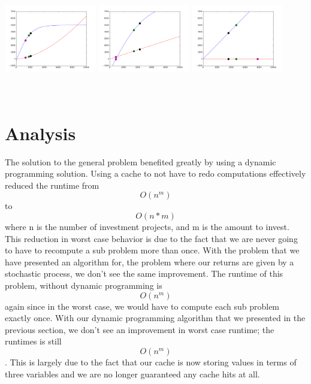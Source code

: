 \documentclass{article}
\begin{document}
\includegraphics[width=4cm, height=5cm]{data_1}
\includegraphics[width=4cm, height=5cm]{data_2}
\includegraphics[width=4cm, height=5cm]{data_3}


\newline
\pagebreak
\section{Analysis}
The solution to the general problem benefited greatly by using a dynamic programming solution.  Using a cache to not have to redo computations effectively reduced the runtime from $$O(n^{m})$$ to $$O(n*m)$$ where n is the number of investment projects, and m is the amount to invest.  This reduction in worst case behavior is due to the fact that we are never going to have to recompute a sub problem more than once.  
\newline
With the problem that we have presented an algorithm for, the problem where our returns are given by a stochastic process, we don't see the same improvement.  The runtime of this problem, without dynamic programming is $$O(n^{m})$$ again since in the worst case, we would have to compute each sub problem exactly once. With our dynamic programming algorithm that we presented in the previous section, we don't see an improvement in worst case runtime; the runtimes is still $$O(n^{m})$$. This is largely due to the fact that our cache is now storing values in terms of three variables and we are no longer guaranteed any cache hits at all. 
\end{document}
